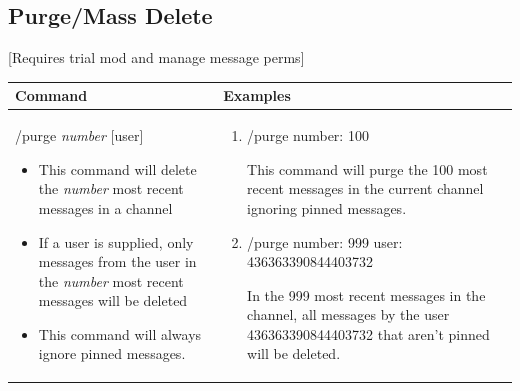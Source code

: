 \documentclass{scrartcl}
\begin{document}
\subsection{Purge/Mass Delete} [Requires trial mod and manage message perms]
\begin{tabularx}{\textwidth}{|>{\raggedright\arraybackslash}X|>{\raggedright\arraybackslash}X|}
\hline
Command & Examples\\
\hline
/purge \textit{number} [user]

\begin{itemize}
    \item This command will delete the \textit{number} most recent messages in a channel
    
    \item If a user is supplied, only messages from the user in the \textit{number} most recent messages will be deleted
    
    \item This command will always ignore pinned messages.
\end{itemize}
&
\begin{enumerate}
    \item /purge number: \color{gray} 100\color{black}
    
    This command will purge the 100 most recent messages in the current channel ignoring pinned messages.
    
    \item /purge number: \color{gray} 999 \color{black} user: \color{gray} 436363390844403732 \color{black}
    
    In the 999 most recent messages in the channel, all messages by the user 436363390844403732 that aren't pinned will be deleted. 
\end{enumerate}\\
\hline

\end{tabularx}
\end{document}
